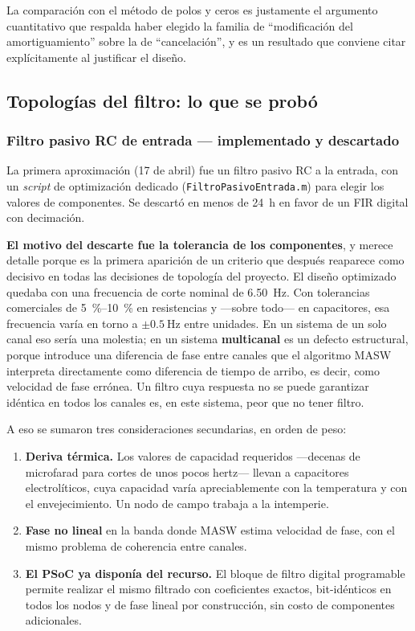 La comparaci\'on con el m\'etodo de polos y ceros es justamente el argumento cuantitativo
que respalda haber elegido la familia de ``modificaci\'on del amortiguamiento'' sobre la de
``cancelaci\'on'', y es un resultado que conviene citar expl\'icitamente al justificar el
dise\~no.

\subsection{Topolog\'ias del filtro: lo que se prob\'o}
\label{sec:mfb}

\subsubsection{Filtro pasivo RC de entrada --- implementado y descartado}

La primera aproximaci\'on (17 de abril) fue un filtro pasivo RC a la entrada, con un
\emph{script} de optimizaci\'on dedicado (\texttt{FiltroPasivoEntrada.m}) para elegir los
valores de componentes. Se descart\'o en menos de \SI{24}{\hour} en favor de un FIR digital
con decimaci\'on.

\textbf{El motivo del descarte fue la tolerancia de los componentes}, y merece detalle
porque es la primera aparici\'on de un criterio que despu\'es reaparece como decisivo en
todas las decisiones de topolog\'ia del proyecto. El dise\~no optimizado quedaba con una
frecuencia de corte nominal de \SI{6.50}{\hertz}. Con tolerancias comerciales de
\SIrange{5}{10}{\percent} en resistencias y ---sobre todo--- en capacitores, esa
frecuencia var\'ia en torno a $\pm\SI{0.5}{\hertz}$ entre unidades. En un sistema de un
solo canal eso ser\'ia una molestia; en un sistema \textbf{multicanal} es un defecto
estructural, porque introduce una diferencia de fase entre canales que el algoritmo MASW
interpreta directamente como diferencia de tiempo de arribo, es decir, como velocidad de
fase err\'onea. Un filtro cuya respuesta no se puede garantizar id\'entica en todos los
canales es, en este sistema, peor que no tener filtro.

A eso se sumaron tres consideraciones secundarias, en orden de peso:

\begin{enumerate}[itemsep=0.15em]
    \item \textbf{Deriva t\'ermica.} Los valores de capacidad requeridos ---decenas de
    microfarad para cortes de unos pocos hertz--- llevan a capacitores electrol\'iticos,
    cuya capacidad var\'ia apreciablemente con la temperatura y con el envejecimiento. Un
    nodo de campo trabaja a la intemperie.
    \item \textbf{Fase no lineal} en la banda donde MASW estima velocidad de fase, con el
    mismo problema de coherencia entre canales.
    \item \textbf{El PSoC ya dispon\'ia del recurso.} El bloque de filtro digital
    programable permite realizar el mismo filtrado con coeficientes exactos,
    bit-id\'enticos en todos los nodos y de fase lineal por construcci\'on, sin costo de
    componentes adicionales.
\end{enumerate}

